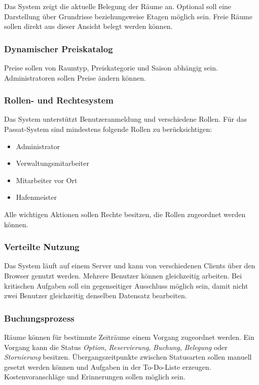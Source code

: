 Das System zeigt die aktuelle Belegung der Räume an. Optional soll eine Darstellung über Grundrisse beziehungsweise Etagen möglich sein. Freie Räume sollen direkt aus dieser Ansicht belegt werden können.

\subsubsection{Dynamischer Preiskatalog}

Preise sollen von Raumtyp, Preiskategorie und Saison abhängig sein. Administratoren sollen Preise ändern können.

\subsubsection{Rollen- und Rechtesystem}

Das System unterstützt Benutzeranmeldung und verschiedene Rollen. Für das Passat-System sind mindestens folgende Rollen zu berücksichtigen:

\begin{itemize}
\item Administrator
\item Verwaltungsmitarbeiter
\item Mitarbeiter vor Ort
\item Hafenmeister
\end{itemize}

Alle wichtigen Aktionen sollen Rechte besitzen, die Rollen zugeordnet werden können.

\subsubsection{Verteilte Nutzung}

Das System läuft auf einem Server und kann von verschiedenen Clients über den Browser genutzt werden. Mehrere Benutzer können gleichzeitig arbeiten. Bei kritischen Aufgaben soll ein gegenseitiger Ausschluss möglich sein, damit nicht zwei Benutzer gleichzeitig denselben Datensatz bearbeiten.

\subsubsection{Buchungsprozess}

Räume können für bestimmte Zeiträume einem Vorgang zugeordnet werden. Ein Vorgang kann die Status \textit{Option}, \textit{Reservierung}, \textit{Buchung}, \textit{Belegung} oder \textit{Stornierung} besitzen. Übergangszeitpunkte zwischen Statusarten sollen manuell gesetzt werden können und Aufgaben in der To-Do-Liste erzeugen. Kostenvoranschläge und Erinnerungen sollen möglich sein.

